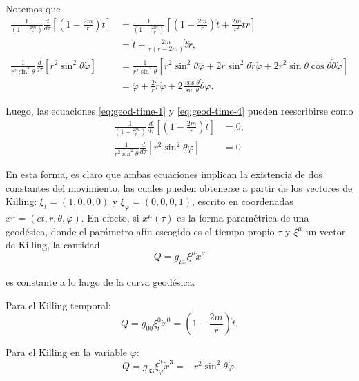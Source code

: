 \documentclass[letterpaper,11pt]{article}
\begin{document}
Notemos que
\begin{align}
    \frac{1}{\left( 1 - \frac{2m}{r} \right)} \frac{d}{d\tau} \left[ \left( 1 -  \frac{2m}{r} \right) \dot{t} \right] &= \frac{1}{\left( 1 - \frac{2m}{r} \right)} \left[ \left( 1 - \frac{2m}{r} \right) \ddot{t} + \frac{2m}{r^2} \dot{t} \dot{r} \right] \nonumber \\
    &= \ddot{t} + \frac{2m}{r\left( r - 2m \right)} \dot{t} \dot{r}, \\
    \frac{1}{r^2 \sin^2\theta} \frac{d}{d\tau} \left[ r^2 \sin^2 \theta \dot{\varphi} \right] &= \frac{1}{r^2\sin^2\theta} \left[ r^2\sin^2\theta \ddot{\varphi} + 2r \sin^2\theta \dot{r} \dot{\varphi} + 2 r^2 \sin \theta \cos\theta \dot{\theta} \dot{\varphi}\right]\nonumber \\
    &= \ddot{\varphi} + \frac{2}{r} \dot{r} \dot{\varphi} + 2 \frac{\cos\theta}{\sin\theta} \dot{\theta} \dot{\varphi}.
\end{align}

Luego, las ecuaciones \eqref{eq:geod-time-1} y \eqref{eq:geod-time-4} pueden reescribirse como
\begin{align}
    \frac{1}{\left( 1 - \frac{2m}{r} \right)} \frac{d}{d\tau} \left[ \left( 1 -  \frac{2m}{r} \right) \dot{t} \right] &= 0, \\
     \frac{1}{r^2 \sin^2\theta} \frac{d}{d\tau} \left[ r^2 \sin^2 \theta \dot{\varphi} \right] &= 0.
\end{align}

En esta forma, es claro que ambas ecuaciones implican la existencia de dos constantes del movimiento, las cuales pueden obtenerse a partir de los vectores de Killing: $\xi_t = (1,0,0,0)$ y $\xi_{\varphi} = (0,0,0,1)$,  escrito en coordenadas $x^{\mu} = (ct,r,\theta,\varphi)$. En efecto, si $x^{\mu}(\tau)$ es la forma paramétrica de una geodésica, donde el parámetro afín escogido es el tiempo propio $\tau$ y $\xi^{\mu}$ un vector de Killing, la cantidad
\begin{equation}
    Q = g_{\mu\nu} \xi^{\mu} \dot{x}^{\nu}
\end{equation}

es constante a lo largo de la curva geodésica.

Para el Killing temporal:
\begin{equation}
    Q = g_{00} \xi_t^0 \dot{x}^0 = \left( 1 - \frac{2m}{r} \right) \dot{t}.
\end{equation}

Para el Killing en la variable $\varphi$:
\begin{equation}
    Q = g_{33} \xi_{\varphi}^3 \dot{x}^3 =  - r^2 \sin^2\theta  \dot{\varphi}.
\end{equation}
\end{document}
